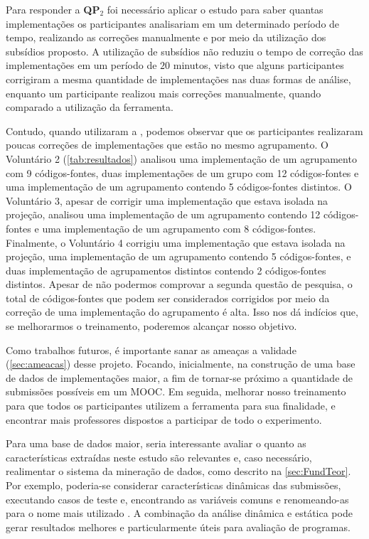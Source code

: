 	Para responder a \textbf{QP$_2$} foi necessário aplicar o estudo
	para saber quantas implementações os participantes analisariam em um determinado
	período de tempo, realizando as correções manualmente e por meio da utilização dos
	subsídios proposto. A utilização de subsídios não reduziu o tempo de correção
	das implementações em um período de $20$ minutos, visto que alguns participantes
	corrigiram a mesma quantidade de implementações nas duas formas de análise, enquanto
	um participante realizou mais correções manualmente, quando comparado a utilização
	da ferramenta.

	Contudo, quando utilizaram a , podemos observar
	que os participantes realizaram poucas correções de implementações que estão no
	mesmo agrupamento. O Voluntário 2 (\cref{tab:resultados}) analisou uma implementação
	de um agrupamento com 9 códigos-fontes, duas implementações de um grupo com 12
	códigos-fontes e uma implementação de um agrupamento contendo 5 códigos-fontes
	distintos. O Voluntário 3, apesar de corrigir uma implementação que estava isolada
	na projeção, analisou uma implementação de um agrupamento contendo 12 códigos-fontes
	e uma implementação de um agrupamento com 8 códigos-fontes. Finalmente, o Voluntário 4
	corrigiu uma implementação que estava isolada na projeção, uma implementação de
	um agrupamento contendo 5 códigos-fontes, e duas implementação de agrupamentos
	distintos contendo 2 códigos-fontes distintos. Apesar de não podermos comprovar
	a segunda questão de pesquisa, o total de códigos-fontes que podem ser considerados
	corrigidos por meio da correção de uma implementação do agrupamento é alta. Isso
	nos dá indícios que, se melhorarmos	o treinamento, poderemos alcançar nosso objetivo.
	
	
	Como trabalhos futuros, é importante sanar as ameaças a validade (\cref{sec:ameacas})
	desse projeto. Focando, inicialmente, na construção de uma base de dados de
	implementações maior, a fim de tornar-se próximo a quantidade de submissões
	possíveis em um \acs{MOOC}. Em seguida, melhorar nosso treinamento para que
	todos os participantes utilizem a ferramenta para sua finalidade, e encontrar
	mais professores dispostos a participar de todo o experimento.
	
	Para uma base de dados maior, seria interessante avaliar o quanto as características
	extraídas neste estudo são relevantes e, caso necessário, realimentar o
	sistema da mineração de dados, como descrito na \cref{sec:FundTeor}. Por
	exemplo, poderia-se considerar características dinâmicas das submissões, executando
	casos de teste e, encontrando as variáveis
	comuns e renomeando-as para o nome mais utilizado \cite{Glassman:2015}.
	A combinação da análise dinâmica e estática pode gerar resultados melhores e
	particularmente úteis para avaliação de programas.
